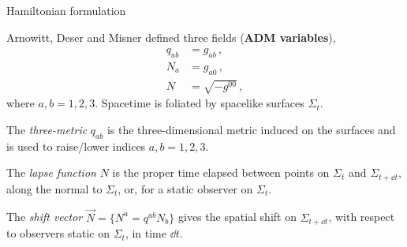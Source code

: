 \documentclass[12pt,titlepage]{article}
\begin{document}

\begin{frame}{Hamiltonian formulation}
    \begin{list}{\,}{\leftmargin=1em \itemindent=0em}
        \item<1-> Arnowitt, Deser and Misner defined three fields (\textbf{ADM variables}),
        \begin{align}
            q_{ab}&=g_{ab}\,,\\
            N_a&=g_{a0}\,,\\
            N&=\sqrt{-g^{00}}\,,
        \end{align}
        where $a,b=1,2,3$. Spacetime is foliated by spacelike surfaces $\Sigma_t$. 
        \item<2-> The \textit{three-metric} $q_{ab}$ is the three-dimensional metric induced on the surfaces and is used to raise/lower indices $a,b=1,2,3$.
        \item<3-> The \textit{lapse function} $N$ is the proper time elapsed between points on $\Sigma_t$ and $\Sigma_{t+\dd{t}}$, along the normal to $\Sigma_t$, or, for a static observer on $\Sigma_t$.
        \item<4-> The \textit{shift vector} $\vec{N}=\{N^a=q^{ab}N_b\}$ gives the spatial shift on $\Sigma_{t+\dd{t}}$, with respect to observers static on $\Sigma_t$, in time $\dd{t}$.
    \end{list}
\end{frame}
\end{document}
